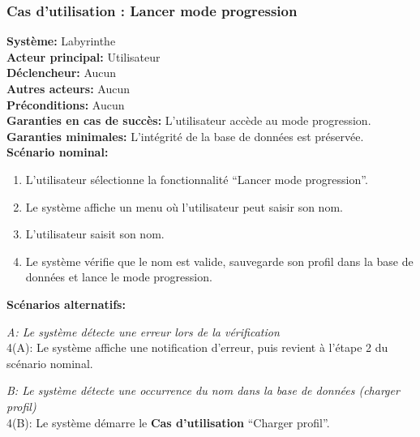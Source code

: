 \documentclass{butexFR}
\begin{document}
\subsubsection{Cas d'utilisation : Lancer mode progression}
\textbf{Système:} Labyrinthe\\
\textbf{Acteur principal:} Utilisateur\\
\textbf{Déclencheur:} Aucun\\
\textbf{Autres acteurs:} Aucun\\
\textbf{Préconditions:} Aucun\\
\textbf{Garanties en cas de succès:} L'utilisateur accède au mode progression.\\
\textbf{Garanties minimales:} L'intégrité de la base de données est préservée.\\
\textbf{Scénario nominal:}
\begin{enumerate}
    \item L'utilisateur sélectionne la fonctionnalité ``Lancer mode progression''.
    \item Le système affiche un menu où l'utilisateur peut saisir son nom.
    \item L'utilisateur saisit son nom.
    \item Le système vérifie que le nom est valide, sauvegarde son profil dans la base de données et lance le mode progression.
\end{enumerate}
\textbf{Scénarios alternatifs:}

\emph{A: Le système détecte une erreur lors de la vérification}\\
\hspace*{1em}4(A): Le système affiche une notification d'erreur, puis revient à l'étape 2 du scénario nominal.

\emph{B: Le système détecte une occurrence du nom dans la base de données (charger profil)}\\
\hspace*{1em}4(B): Le système démarre le \textbf{Cas d'utilisation} ``Charger profil''.

\newpage
\end{document}
